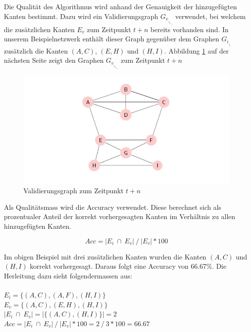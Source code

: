 Die Qualität des Algorithmus wird anhand der Genauigkeit der hinzugefügten Kanten bestimmt.
Dazu wird ein Validierungsgraph $G_v_,_t_+_n$ verwendet, bei welchem die zusätzlichen Kanten $E_v$ zum Zeitpunkt $t + n$ bereits vorhanden sind.
In unserem Beispielnetzwerk enthält dieser Graph gegenüber dem Graphen $G_i_,_t$ zusätzlich die Kanten $(A,C)$, $(E,H)$ und $(H,I)$.
Abbildung \ref{fig:graph_validation} auf der nächsten Seite zeigt den Graphen $G_v_,_t_+_n$ zum Zeitpunkt $t + n$

\begin{figure}[h]
    \centering
    \includegraphics{resources/graph_validation.JPG}
    \caption{Validierungsgraph zum Zeitpunkt $t + n$}
    \label{fig:graph_validation}
\end{figure}

Als Qualitätsmass wird die Accuracy verwendet.
Diese berechnet sich als prozentualer Anteil der korrekt vorhergesagten Kanten im Verhältnis zu allen hinzugefügten Kanten.

\begin{equation}
    \label{eq:acc}
    Acc = | E_i \ \cap \ E_v| \ / \ |E_v| * 100
\end{equation}

Im obigen Beispiel mit drei zusätzlichen Kanten wurden die Kanten $(A,C)$ und $(H,I)$ korrekt vorhergesagt.
Daraus folgt eine Accuracy von 66.67\%.
Die Herleitung dazu sieht folgendermassen aus:\\
\\
\vspace{4mm}
\forceindent $E_i = \{(A,C), (A,F), (H,I)\}$\\
\vspace{4mm}
\forceindent $E_v = \{(A,C), (E,H), (H,I)\}$\\
\vspace{4mm}
\forceindent $| E_i \ \cap \ E_v| = |\{(A,C), (H,I)\}| = 2$\\
\vspace{4mm}
\forceindent $Acc = | E_i \ \cap \ E_v| \ / \ |E_v| * 100 = 2 \ / \ 3 * 100 = 66.67$\\

